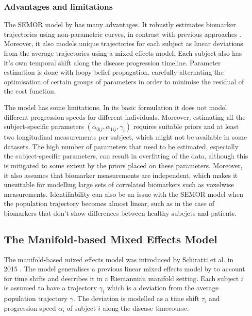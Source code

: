 \subsubsection{Advantages and limitations}

The SEMOR model by \cite{donohue2014estimating} has many advantages. It robustly estimates biomarker trajectories using non-parametric curves, in contrast with previous approaches \cite{jedynak2012computational, fonteijn2012event}. Moreover, it also models unique trajectories for each subject as linear deviations from the average trajectories using a mixed effects model. Each subject also has it's own temporal shift along the disease progression timeline. Parameter estimation is done with loopy belief propagation, carefully alternating the optimisation of certain groups of parameters in order to minimise the residual of the cost function.

The model has some limitations. In its basic formulation it does not model different progression speeds for different individuals. Moreover, estimating all the subject-specific parameters $(\alpha_{0ij}, \alpha_{1ij}, \gamma_i)$ requires suitable priors and at least two longitudinal measurements per subject, which might not be available in some datasets. The high number of parameters that need to be estimated, especially the subject-specific parameters, can result in overfitting of the data, although this is mitigated to some extent by the priors placed on these parameters. Moreover, it also assumes that biomarker measurements are independent, which makes it unsuitable for modelling large sets of correlated biomarkers such as voxelwise measurements. Identifiability can also be an issue with the SEMOR model when the population trajectory becomes almost linear, such as in the case of biomarkers that don't show differences between healthy subejcts and patients.

\subsection{The Manifold-based Mixed Effects Model}
\label{sec:bckMan}

The manifold-based mixed effects model was introduced by Schiratti et al. in 2015 \cite{schiratti2015mixed}. The model generalises a previous linear mixed effects model by \cite{datar2012mixed} to account for time shifts and describes it in a Riemannian manifold setting. Each subject $i$ is assumed to have a trajectory $\gamma_{i}$ which is a deviation from the average population trajectory $\gamma$. The deviation is modelled as a time shift $\tau_i$ and progression speed $\alpha_i$ of subject $i$ along the disease timecourse. 

